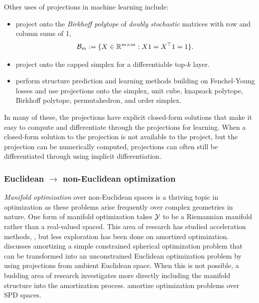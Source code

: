 \noindent Other uses of projections in machine learning include:
\begin{itemize}
\item \citet{adams2011ranking,santa2017deeppermnet,mena2018learning}
  project onto the \emph{Birkhoff polytope} of
  \emph{doubly stochastic} matrices with row and
  column sums of 1, \ie
  \begin{equation}
    \label{eq:birkhoff}
    {\mathcal{B}}_m\vcentcolon= \{X\in\mathbb{R}^{m\times m}: X1=X^\top1=1\}.
  \end{equation}
\item \citet{amos2019limited} project onto the capped
  simplex for a differentiable top-$k$ layer.
\item \citet{blondel2019structured} perform structure
  prediction and learning methods building on Fenchel-Young losses
  \citep{blondel2020learning} and use projections onto the
  simplex, unit cube, knapsack polytope, Birkhoff polytope,
  permutahedron, and order simplex.
\end{itemize}

In many of these, the projections have explicit closed-form
solutions that make it easy to compute and differentiate
through the projections for learning.
When a closed-form solution to the projection is not available to
the project, but the projection can be numerically computed,
projections can often still be differentiated through using
implicit differentiation.

\subsubsection{Euclidean $\rightarrow$ non-Euclidean optimization}
\emph{Manifold optimization} \citep{absil2009optimization,hu2019brief}
over non-Euclidean spaces is a thriving topic in optimization
as these problems arise frequently over complex geometries in nature.
One form of manifold optimization takes ${\mathcal{Y}}$ to be a Riemannian
manifold rather than a real-valued spaced.
This area of research has studied acceleration methods,
\citep{duruisseaux2022accelerated}, but less exploration
has been done on amortized optimization.
 discusses amortizing a simple
constrained spherical optimization problem that can be
transformed into an unconstrained Euclidean optimization
problem by using projections from ambient Euclidean space.
When this is not possible, a budding area of research investigates
more directly including the manifold structure into the
amortization process. \citet{gao2020learning} amortize optimization
problems over SPD spaces.

